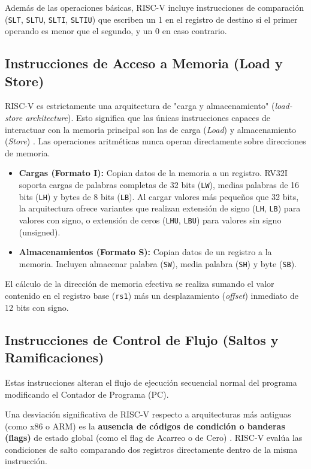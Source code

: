 Además de las operaciones básicas, RISC-V incluye instrucciones de comparación (\texttt{SLT}, \texttt{SLTU}, \texttt{SLTI}, \texttt{SLTIU}) que escriben un 1 en el registro de destino si el primer operando es menor que el segundo, y un 0 en caso contrario.

\subsection{Instrucciones de Acceso a Memoria (Load y Store)}
RISC-V es estrictamente una arquitectura de "carga y almacenamiento" (\textit{load-store architecture}). Esto significa que las únicas instrucciones capaces de interactuar con la memoria principal son las de carga (\textit{Load}) y almacenamiento (\textit{Store}) \cite{waterman2014riscv}. Las operaciones aritméticas nunca operan directamente sobre direcciones de memoria.

\begin{itemize}
    \item \textbf{Cargas (Formato I):} Copian datos de la memoria a un registro. RV32I soporta cargas de palabras completas de 32 bits (\texttt{LW}), medias palabras de 16 bits (\texttt{LH}) y bytes de 8 bits (\texttt{LB}). Al cargar valores más pequeños que 32 bits, la arquitectura ofrece variantes que realizan extensión de signo (\texttt{LH}, \texttt{LB}) para valores con signo, o extensión de ceros (\texttt{LHU}, \texttt{LBU}) para valores sin signo (unsigned).
    \item \textbf{Almacenamientos (Formato S):} Copian datos de un registro a la memoria. Incluyen almacenar palabra (\texttt{SW}), media palabra (\texttt{SH}) y byte (\texttt{SB}).
\end{itemize}
El cálculo de la dirección de memoria efectiva se realiza sumando el valor contenido en el registro base (\texttt{rs1}) más un desplazamiento (\textit{offset}) inmediato de 12 bits con signo. 

\subsection{Instrucciones de Control de Flujo (Saltos y Ramificaciones)}
Estas instrucciones alteran el flujo de ejecución secuencial normal del programa modificando el Contador de Programa (PC). 

Una desviación significativa de RISC-V respecto a arquitecturas más antiguas (como x86 o ARM) es la \textbf{ausencia de códigos de condición o banderas (flags)} de estado global (como el flag de Acarreo o de Cero) \cite{patterson2017riscv}. RISC-V evalúa las condiciones de salto comparando dos registros directamente dentro de la misma instrucción.

